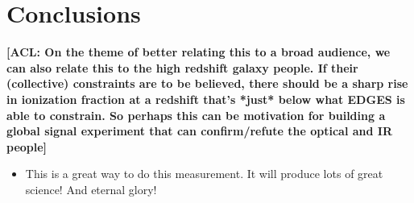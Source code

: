 \documentclass[twolcolumn,apj,iop,numberedappendix]{emulateapj}
\newcommand{\acl}[1]{{\color{red} \textbf{[ACL:  #1]}}}
\newcommand{\mep}[1]{{\color{applegreen} \textbf{[MEP:  #1]}}}
\begin{document}
%
%
%
%
%

\section{Conclusions}
\label{sec:Conc}
\acl{On the theme of better relating this to a broad audience, we can also relate this to the high redshift galaxy people.  If their (collective) constraints are to be believed, there should be a sharp rise in ionization fraction at a redshift that's *just* below what EDGES is able to constrain.  So perhaps this can be motivation for building a global signal experiment that can confirm/refute the optical and IR people}
\begin{itemize}
\item This is a great way to do this measurement.  It will produce lots of great science! And eternal glory!
\end{itemize}
\end{document}
